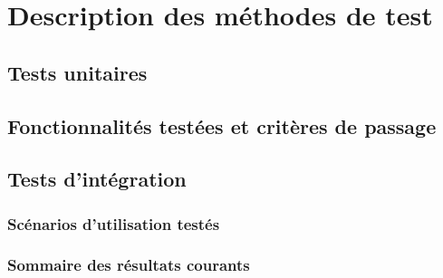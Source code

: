 \section{Description des méthodes de test}
\lipsumC

    \subsection{Tests unitaires}
    \lipsumC
    
    \subsection{Fonctionnalités testées et critères de passage}
    \lipsumC
    
    \subsection{Tests d'intégration}
    \lipsumC
    
        \subsubsection{Scénarios d'utilisation testés}
        \lipsumC
        
        \subsubsection{Sommaire des résultats courants}
        \lipsumC
        
        